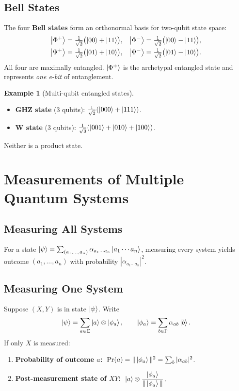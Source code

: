 \documentclass[11pt]{article}
\theoremstyle{definition}
\newtheorem{example}{Example}[section]
\begin{document}
\subsection{Bell States}

The four \textbf{Bell states} form an orthonormal basis for two-qubit state space:
\begin{align}
    \ket{\Phi^+} &= \tfrac{1}{\sqrt{2}}\bigl(\ket{00}+\ket{11}\bigr), &
    \ket{\Phi^-} &= \tfrac{1}{\sqrt{2}}\bigl(\ket{00}-\ket{11}\bigr), \\
    \ket{\Psi^+} &= \tfrac{1}{\sqrt{2}}\bigl(\ket{01}+\ket{10}\bigr), &
    \ket{\Psi^-} &= \tfrac{1}{\sqrt{2}}\bigl(\ket{01}-\ket{10}\bigr).
\end{align}
All four are maximally entangled.  $\ket{\Phi^+}$ is the archetypal entangled state and represents \emph{one e-bit} of entanglement.

\begin{example}[Multi-qubit entangled states]
\begin{itemize}
    \item \textbf{GHZ state} (3 qubits): $\frac{1}{\sqrt{2}}(\ket{000}+\ket{111})$.
    \item \textbf{W state} (3 qubits): $\frac{1}{\sqrt{3}}(\ket{001}+\ket{010}+\ket{100})$.
\end{itemize}
Neither is a product state.
\end{example}

\section{Measurements of Multiple Quantum Systems}

\subsection{Measuring All Systems}

For a state $\ket{\psi}=\sum_{(a_1,\dots,a_n)}\alpha_{a_1\cdots a_n}\ket{a_1\cdots a_n}$, measuring every system yields outcome $(a_1,\dots,a_n)$ with probability $|\alpha_{a_1\cdots a_n}|^2$.

\subsection{Measuring One System}

Suppose $(X,Y)$ is in state $\ket{\psi}$.  Write
\[
    \ket{\psi} = \sum_{a\in\Sigma}\ket{a}\otimes\ket{\phi_a},
    \qquad \ket{\phi_a}=\sum_{b\in\Gamma}\alpha_{ab}\ket{b}.
\]
If only $X$ is measured:
\begin{enumerate}
    \item \textbf{Probability of outcome $a$:} $\;\Pr(a) = \|\ket{\phi_a}\|^2 = \sum_b |\alpha_{ab}|^2$.
    \item \textbf{Post-measurement state of $XY$:} $\;\displaystyle\ket{a}\otimes\frac{\ket{\phi_a}}{\|\ket{\phi_a}\|}$.
\end{enumerate}
\end{document}

